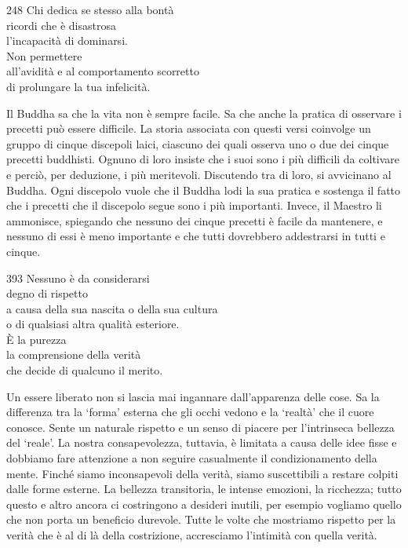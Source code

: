 
\begin{dhpVerse}{248}
\label{dhp-248}
Chi dedica se stesso alla bontà\\
ricordi che è disastrosa\\
l'incapacità di dominarsi.\\
Non permettere\\
all'avidità e al comportamento scorretto\\
di prolungare la tua infelicità.
\end{dhpVerse}

\begin{dhpRefl}
  Il Buddha sa che la vita non è sempre facile. Sa che anche la pratica di
  osservare i precetti può essere difficile. La storia associata con questi
  versi coinvolge un gruppo di cinque discepoli laici, ciascuno dei quali
  osserva uno o due dei cinque precetti buddhisti. Ognuno di loro insiste che i
  suoi sono i più difficili da coltivare e perciò, per deduzione, i più
  meritevoli. Discutendo tra di loro, si avvicinano al Buddha. Ogni discepolo
  vuole che il Buddha lodi la sua pratica e sostenga il fatto che i precetti che
  il discepolo segue sono i più importanti. Invece, il Maestro li ammonisce,
  spiegando che nessuno dei cinque precetti è facile da mantenere, e nessuno di
  essi è meno importante e che tutti dovrebbero addestrarsi in tutti e cinque.
\end{dhpRefl}


\begin{dhpVerse}{393}
\label{dhp-393}
Nessuno è da considerarsi\\
degno di rispetto\\
a causa della sua nascita o della sua cultura\\
o di qualsiasi altra qualità esteriore.\\
È la purezza\\
la comprensione della verità\\
che decide di qualcuno il merito.
\end{dhpVerse}

\begin{dhpRefl}
  Un essere liberato non si lascia mai ingannare dall'apparenza delle cose. Sa
  la differenza tra la `forma' esterna che gli occhi vedono e la `realtà' che il
  cuore conosce. Sente un naturale rispetto e un senso di piacere per
  l'intrinseca bellezza del `reale'. La nostra consapevolezza, tuttavia, è
  limitata a causa delle idee fisse e dobbiamo fare attenzione a non seguire
  casualmente il condizionamento della mente. Finché siamo inconsapevoli della
  verità, siamo suscettibili a restare colpiti dalle forme esterne. La bellezza
  transitoria, le intense emozioni, la ricchezza; tutto questo e altro ancora ci
  costringono a desideri inutili, per esempio vogliamo quello che non porta un
  beneficio durevole. Tutte le volte che mostriamo rispetto per la verità che è
  al di là della costrizione, accresciamo l'intimità con quella verità.
\end{dhpRefl}

